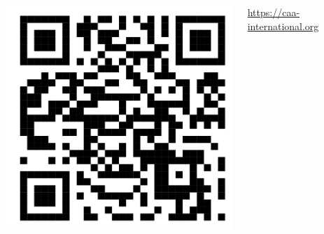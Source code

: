 \documentclass[xcolor=dvipsnames, 10pt, french, american]{beamer}
\begin{document}
\begin{frame}
\begin{columns}[t]
            \centering
            \includegraphics[height=0.2\textheight]{figures/CAA-Int_QR-Code-04}
            
            \footnotesize\url{https://caa-international.org}
    \end{columns}
\end{frame}
\end{document}
